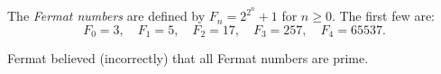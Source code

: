 The \textit{Fermat numbers} are defined by $F_n = 2^{2^n} + 1$ for $n \geq 0$. The first few are:
$$F_0 = 3, \quad F_1 = 5, \quad F_2 = 17, \quad F_3 = 257, \quad F_4 = 65537.$$

Fermat believed (incorrectly) that all Fermat numbers are prime.
